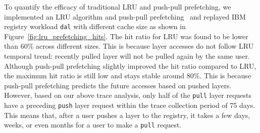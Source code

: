 To quantify the efficacy of traditional LRU and push-pull prefetching,
we implemented an LRU algorithm and push-pull prefetching~\cite{dockerworkload} 
and replayed 
IBM registry workload \texttt{dal} with different cache size as shown in 
Figure~\ref{fig:lru_prefetching_hits}.
The hit ratio for LRU was found to be lower than $60$\% across different sizes.
This is because layer accesses do not follow LRU temporal trend:
recently pulled layer will not be pulled again by the same user.
Although push-pull prefetching slightly improved the hit ratio compared to LRU,
the maximum hit ratio is still low and stays stable around $80$\%.
This is because push-pull prefetching predicts the future accesses based on  
pushed layers.
However, based on our above trace analysis,
only half of the \texttt{pull} layer
requests have a preceding \texttt{push} layer request within the trace
collection period of 75 days. This means that, after a user pushes a layer
to the registry, it takes a few days, weeks, or even months for a user to make
a \texttt{pull} request. 




